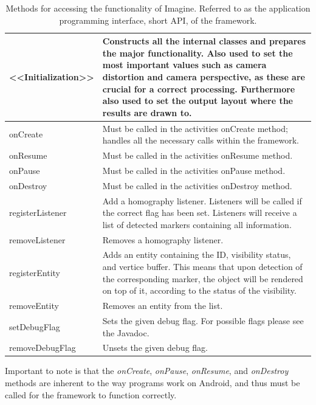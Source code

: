 \begin{table}[H]
	\centering
	{\footnotesize
	\begin{tabulary}{\textwidth}{p{2.5cm} || J}
	<<Initialization>> & Constructs all the internal classes and prepares the major functionality. Also used to set the most important values such as camera distortion and camera perspective, as these are crucial for a correct processing. Furthermore also used to set the output layout where the results are drawn to.\\
	\hline
	onCreate & Must be called in the activities onCreate method; handles all the necessary calls within the framework.\\
	\hline
	onResume & Must be called in the activities onResume method.\\
	\hline
	onPause & Must be called in the activities onPause method.\\
	\hline
	onDestroy & Must be called in the activities onDestroy method.\\
	\hline
	registerListener & Add a homography listener. Listeners will be called if the correct flag has been set. Listeners will receive a list of detected markers containing all information.\\
	\hline
	removeListener & Removes a homography listener. \\
	\hline
	registerEntity & Adds an entity containing the ID, visibility status, and vertice buffer. This means that upon detection of the corresponding marker, the object will be rendered on top of it, according to the status of the visibility.\\
	\hline
	removeEntity & Removes an entity from the list.\\
	\hline
	setDebugFlag & Sets the given debug flag. For possible flags please see the Javadoc.\\
	\hline
	removeDebugFlag & Unsets the given debug flag.\\
	\end{tabulary}
	}
	\caption[Application Programming Interface]{Methods for accessing the functionality of Imagine. Referred to as the application programming interface, short API, of the framework.}
	\label{api}
\end{table}

Important to note is that the \textit{onCreate}, \textit{onPause}, \textit{onResume}, and \textit{onDestroy} methods are inherent to the way programs work on Android, and thus must be called for the framework to function correctly.

